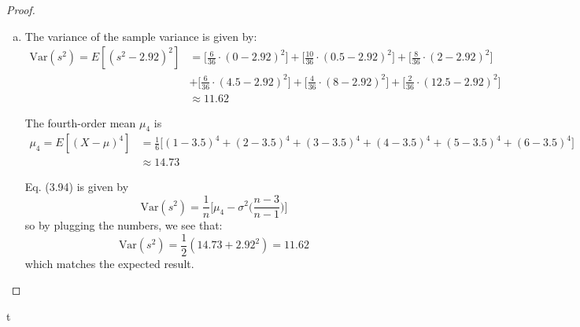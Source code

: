 \begin{proof}
\begin{enumerate}[(a)]
    \vspace{1em}

    \item The variance of the sample variance is given by:
        \begin{align*}
            \text{Var}(s^2) = E[(s^2 - 2.92)^2]
               &= \bigg[\frac{6}{36} \cdot (0 - 2.92)^2\bigg] 
                + \bigg[\frac{10}{36} \cdot (0.5 - 2.92)^2\bigg]
                + \bigg[\frac{8}{36} \cdot (2 - 2.92)^2\bigg] \\ 
               &+ \bigg[\frac{6}{36} \cdot (4.5 - 2.92)^2\bigg]
                + \bigg[\frac{4}{36} \cdot (8 - 2.92)^2\bigg]
                + \bigg[\frac{2}{36} \cdot (12.5 - 2.92)^2\bigg] \\
               &\approx 11.62
        \end{align*}

        The fourth-order mean $\mu_4$ is
        \begin{align*}
            \mu_4 = E[(X - \mu)^4] 
            &= \frac{1}{6}\big[(1 - 3.5)^4 + (2 - 3.5)^4 + (3 - 3.5)^4 
                + (4 - 3.5)^4 + (5 - 3.5)^4 + (6 - 3.5)^4] \\
            &\approx 14.73
        \end{align*}

        Eq. (3.94) is given by
        \begin{equation*}\tag{3.94}
            \text{Var}(s^2) = \frac{1}{n}\bigg[\mu_4 - \sigma^2\bigg(\frac{n-3}{n-1}\bigg)\bigg]
        \end{equation*}
        so by plugging the numbers, we see that: 
        \[
            \text{Var}(s^2) = \frac{1}{2}(14.73 + {2.92}^2) = 11.62
        \] 
        which matches the expected result.
    \end{enumerate}
\end{proof}t
